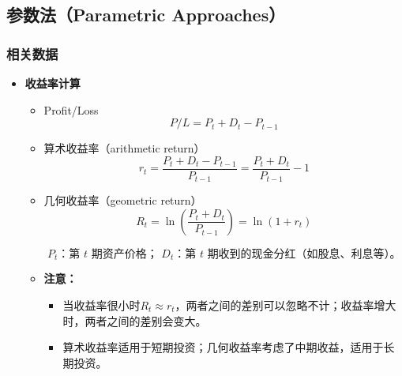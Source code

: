 


\subsection{参数法（Parametric Approaches）}

\subsubsection{相关数据}


    \begin{itemize}

       
   

        \item \textbf{收益率计算}
        \begin{itemize}
            \item Profit/Loss
            \[ {P/L} = P_t+D_t-P_{t-1} \]


            \item 算术收益率（arithmetic return）
           \[ {r_t} = \frac{{P_t+D_t-P_{t-1}}}{P_{t-1}} =\frac{{P_t+D_t}}{P_{t-1}}-1\]


            \item 几何收益率（geometric return）
            \[ {R_t} = \ln \left( \frac{{P_t+D_t}}{P_{t-1}} \right) = \ln \left( 1+{r_t} \right) \]
            
          
\[
P_t \text{：第 } t \text{ 期资产价格； } D_t \text{：第 } t \text{ 期收到的现金分红（如股息、利息等）。}
\]



            \item \textbf{注意：}
            \begin{itemize}
                \item 当收益率很小时$R_t \approx r_t$，两者之间的差别可以忽略不计；收益率增大时，两者之间的差别会变大。
                \item 算术收益率适用于短期投资；几何收益率考虑了中期收益，适用于长期投资。
            \end{itemize}
        \end{itemize}
    \end{itemize}


